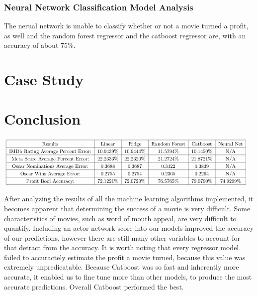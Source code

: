 \documentclass[11pt]{article}
\begin{document}
\hypertarget{neural-network-classification-model-analysis}{%
	\subsubsection{Neural Network Classification Model Analysis}\label{neural-network-classification-model-analysis}}

The nerual network is unable to classify whether or not a movie turned a profit, as well and the random forest regressor and the catboost regressor are, with an accuracy of about 75\%.

\hypertarget{case-study}{%
	\section{Case Study}\label{case-study}}

\hypertarget{conclusion}{%
	\section{Conclusion}\label{conclusion}}

\[
\begin{tikzpicture}
\node[rotate=0,scale=.8]{
\begin{tabular}{|c|c|c|c|c|c|c}
\cline{1-6}
Results & Linear & Ridge & Random Forest & Catboost & Neural Net & \rule{0pt}{2.6ex} \\
\cline{1-6}
IMDb Rating Average Percent Error: & 10.9439\% & 10.9444\% & 11.5794\% & 10.1450\% & N/A & \rule{0pt}{2.6ex} \\
\cline{1-6}
Meta Score Average Percent Error: & 22.2333\% & 22.2320\% & 21.2724\% & 21.8721\% & N/A & \rule{0pt}{2.6ex} \\
\cline{1-6}
Oscar Nominations Average Error: & 0.3688 & 0.3687 & 0.3422 & 0.3839 & N/A & \rule{0pt}{2.6ex} \\
\cline{1-6}
Oscar Wins Average Error: & 0.2755 & 0.2754 & 0.2365 & 0.2264 & N/A & \rule{0pt}{2.6ex} \\
\cline{1-6}
Profit Bool Accuracy: & 72.1221\% & 72.0720\% & 76.5765\% & 79.0790\% & 74.9299\% & \rule{0pt}{2.6ex} \\
\cline{1-6}
\end{tabular}};
\end{tikzpicture}
\]

After analyzing the results of all the machine learning algorithms implemented, it becomes apparent that determining the success of a movie is very difficult. Some characteristics of movies, such as word of mouth appeal, are very difficult to quantify. Including an actor network score into our models improved the accuracy of our predictions, however there are still many other variables to account for that detract from the accuracy. It is worth noting that every regressor model failed to accuractely estimate the profit a movie turned, because this value was extremely unpredicatable. Because Catboost was so fast and inherently more accurate, it enabled us to fine tune more than other models, to produce the most accurate predictions. Overall Catboost performed the best.
\end{document}
